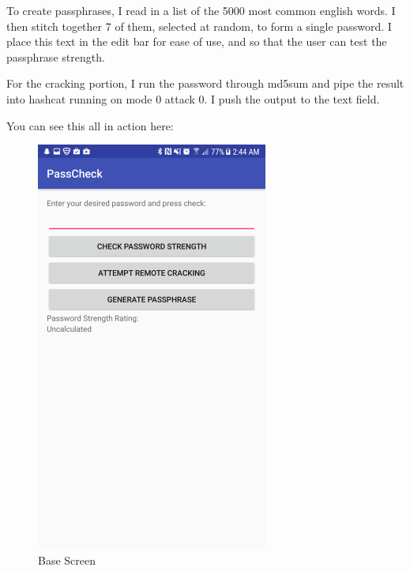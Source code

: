 \documentclass{article}
\begin{document}
To create passphrases, I read in a list of the 5000 most common english words. I then stitch together 7 of them, selected at random, to form a single password. I place this text in the edit bar for ease of use, and so that the user can test the passphrase strength.

For the cracking portion, I run the password through md5sum and pipe the result into hashcat running on mode 0 attack 0. I push the output to the text field.

You can see this all in action here:
\begin{figure}[ht]
      \includegraphics[width=3in]{img/t5s1.png}
      \centering
      \caption{Base Screen}
\end{figure}
\end{document}
